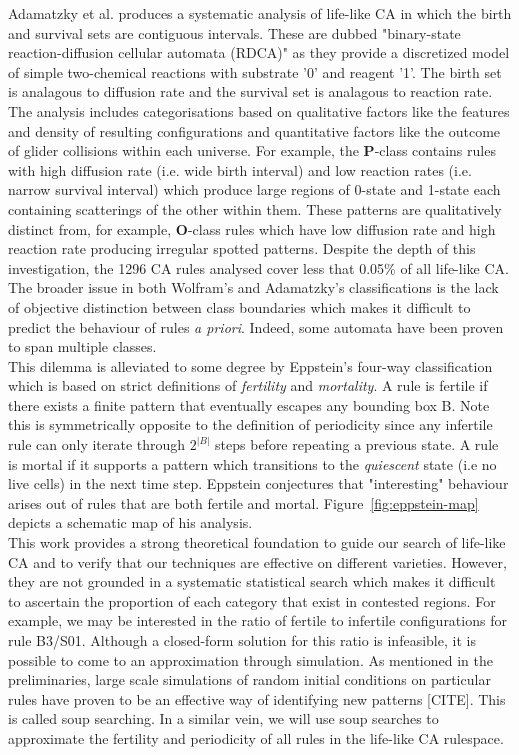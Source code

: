Adamatzky et al.\cite{adamatzky2006phenomenology} produces a systematic analysis of life-like CA in which the birth and survival sets are contiguous intervals. These are dubbed "binary-state reaction-diffusion cellular automata (RDCA)" as they provide a discretized model of simple two-chemical reactions with substrate '0' and reagent '1'. The birth set is analagous to diffusion rate and the survival set is analagous to reaction rate. The analysis includes categorisations based on qualitative factors like the features and density of resulting configurations and quantitative factors like the outcome of glider collisions within each universe. For example, the \textbf{P}-class contains rules with high diffusion rate (i.e. wide birth interval) and low reaction rates (i.e. narrow survival interval) which produce large regions of 0-state and 1-state each containing scatterings of the other within them. These patterns are qualitatively distinct from, for example, \textbf{O}-class rules which have low diffusion rate and high reaction rate producing irregular spotted patterns. Despite the depth of this investigation, the 1296 CA rules analysed cover less that 0.05\% of all life-like CA. The broader issue in both Wolfram's and Adamatzky's classifications is the lack of objective distinction between class boundaries which makes it difficult to predict the behaviour of rules \textit{a priori}. Indeed, some automata have been proven to span multiple classes\cite{baldwin1999classi}.\\

This dilemma is alleviated to some degree by Eppstein's four-way classification\cite{eppstein2010growth} which is based on strict definitions of \textit{fertility} and \textit{mortality}. A rule is fertile if there exists a finite pattern that eventually escapes any bounding box B. Note this is symmetrically opposite to the definition of periodicity since any infertile rule can only iterate through $2^{|B|}$ steps before repeating a previous state. A rule is mortal if it supports a pattern which transitions to the \textit{quiescent} state (i.e no live cells) in the next time step. Eppstein conjectures that "interesting" behaviour arises out of rules that are both fertile and mortal. Figure~\ref{fig:eppstein-map} depicts a schematic map of his analysis.\\

This work provides a strong theoretical foundation to guide our search of life-like CA and to verify that our techniques are effective on different varieties. However, they are not grounded in a systematic statistical search which makes it difficult to ascertain the proportion of each category that exist in contested regions. For example, we may be interested in the ratio of fertile to infertile configurations for rule B3/S01. Although a closed-form solution for this ratio is infeasible, it is possible to come to an approximation through simulation. As mentioned in the preliminaries, large scale simulations of random initial conditions on particular rules have proven to be an effective way of identifying new patterns [CITE]. This is called soup searching. In a similar vein, we will use soup searches to approximate the fertility and periodicity of all rules in the life-like CA rulespace.

